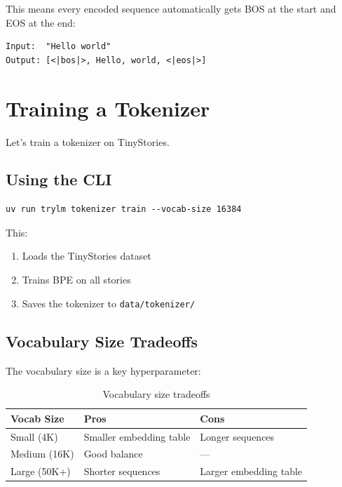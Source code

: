 This means every encoded sequence automatically gets BOS at the start and EOS at the end:

\begin{lstlisting}[style=shell, numbers=none]
Input:  "Hello world"
Output: [<|bos|>, Hello, world, <|eos|>]
\end{lstlisting}

\section{Training a Tokenizer}

Let's train a tokenizer on TinyStories.

\subsection{Using the CLI}

\begin{lstlisting}[style=shell]
uv run trylm tokenizer train --vocab-size 16384
\end{lstlisting}

This:
\begin{enumerate}
    \item Loads the TinyStories dataset
    \item Trains BPE on all stories
    \item Saves the tokenizer to \texttt{data/tokenizer/}
\end{enumerate}

\subsection{Vocabulary Size Tradeoffs}

The vocabulary size is a key hyperparameter:

\begin{table}[H]
\centering
\begin{tabular}{lll}
\toprule
\textbf{Vocab Size} & \textbf{Pros} & \textbf{Cons} \\
\midrule
Small (4K) & Smaller embedding table & Longer sequences \\
Medium (16K) & Good balance & --- \\
Large (50K+) & Shorter sequences & Larger embedding table \\
\bottomrule
\end{tabular}
\caption{Vocabulary size tradeoffs}
\end{table}

